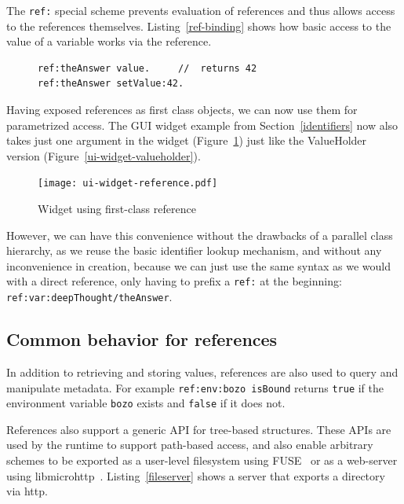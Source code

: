 \documentclass{acm_proc_article-sp}
\begin{document}
The {\tt ref:} special scheme prevents evaluation of references and thus allows access
to the references themselves.  Listing~\ref{ref-binding} shows how basic access to
the value of a variable works via the reference.


\begin{figure}[htbp]
\begin{lstlisting}[style=numbers,label=ref-binding,caption=Retrieve and store value via its reference.]
ref:theAnswer value.     //  returns 42
ref:theAnswer setValue:42.  
\end{lstlisting}
\end{figure}

Having exposed references as first class objects, we can now use them for parametrized 
access.  The GUI widget example from Section~\ref{identifiers} now
also takes just one argument in the widget (Figure~\ref{ui-widget-reference}) just like
the ValueHolder version (Figure~\ref{ui-widget-valueholder}).

\begin{figure}[htbp]
\centering
\texttt{[image: ui-widget-reference.pdf]}
\caption{Widget using first-class reference}
\label{ui-widget-reference}

\end{figure}

However, we can have this convenience without the drawbacks of a parallel class
hierarchy, as we reuse the basic identifier lookup mechanism, and without any
inconvenience in creation, because we can just use the same syntax as we would
with a direct reference, only having to prefix a {\tt ref:} at the beginning:  {\tt ref:var:deepThought/theAnswer}.


\subsection{Common behavior for references}
\label{common-reference-behavior}
In addition to retrieving and storing values, references are also used to query and manipulate
metadata.  For example {\tt ref:env:bozo isBound} returns {\tt true} if the environment
variable {\tt bozo} exists and {\tt false} if it does not.

References also support a generic API for tree-based structures.   These APIs are used
by the runtime to support path-based access, and also enable arbitrary
schemes to be exported as a user-level filesystem using FUSE~\cite{fuse} or as a web-server using libmicrohttp~\cite{libmicrohttp}.
Listing~\ref{fileserver} shows a server that exports a directory via http.
\end{document}
